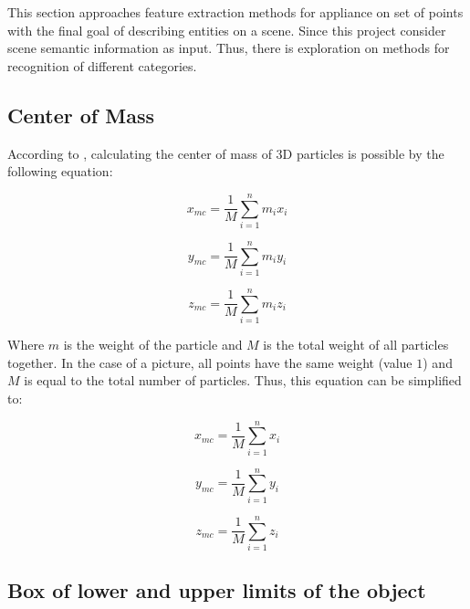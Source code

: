     This section approaches feature extraction methods for appliance on set of points with the final goal of describing entities on a scene. Since this project consider scene semantic information as input. Thus, there is exploration on methods for recognition of different categories. 
    
\subsection{Center of Mass}

    According to \cite[p. 219]{halliday-Mass-Center}, calculating the center of mass of 3D particles is possible by the following equation:
    
    \begin{equation}\label{eq:MassCenterX1}
    x_{mc} = \frac{1}{M}\sum_{i=1}^{n}m_{i}x_{i} 
    \end{equation}
    
    \begin{equation}\label{eq:MassCenterY1}
    y_{mc} = \frac{1}{M}\sum_{i=1}^{n}m_{i}y_{i}
    \end{equation}
    
    \begin{equation}\label{eq:MassCenterZ1}
    z_{mc} = \frac{1}{M}\sum_{i=1}^{n}m_{i}z_{i}
    \end{equation}
    
    Where \(m\) is the weight of the particle and \(M\) is the total weight of all particles together. In the case of a picture, all points have the same weight (value \(1\)) and \(M\) is equal to the total number of particles. Thus, this equation can be simplified to:
    
    \begin{equation}\label{eq:MassCenterX2}
    x_{mc} = \frac{1}{M}\sum_{i=1}^{n}x_{i} 
    \end{equation}
    
    \begin{equation}\label{eq:MassCenterY2}
    y_{mc} = \frac{1}{M}\sum_{i=1}^{n}y_{i}
    \end{equation}
    
    \begin{equation}\label{eq:MassCenterZ2}
    z_{mc} = \frac{1}{M}\sum_{i=1}^{n}z_{i}
    \end{equation}
    
    
\subsection{Box of lower and upper limits of the object}

